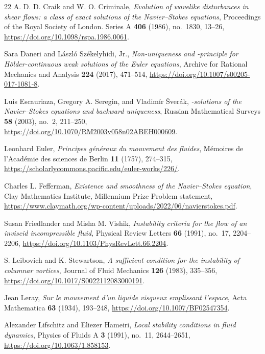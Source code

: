 \begin{thebibliography}{22}
A. D. D. Craik and W. O. Criminale,
\emph{Evolution of wavelike disturbances in shear flows: a class of exact solutions of the Navier--Stokes equations},
Proceedings of the Royal Society of London. Series A \textbf{406} (1986),
no.~1830, 13--26, \url{https://doi.org/10.1098/rspa.1986.0061}.

Sara Daneri and László Székelyhidi, Jr.,
\emph{Non-uniqueness and -principle for Hölder-continuous weak solutions of the Euler equations},
Archive for Rational Mechanics and Analysis \textbf{224} (2017), 471--514,
\url{https://doi.org/10.1007/s00205-017-1081-8}.

Luis Escauriaza, Gregory A. Seregin, and Vladimír Šverák,
\emph{-solutions of the Navier--Stokes equations and backward uniqueness},
Russian Mathematical Surveys \textbf{58} (2003), no.~2, 211--250,
\url{https://doi.org/10.1070/RM2003v058n02ABEH000609}.

Leonhard Euler, \emph{Principes généraux du mouvement des fluides},
Mémoires de l'Académie des sciences de Berlin \textbf{11} (1757), 274--315,
\url{https://scholarlycommons.pacific.edu/euler-works/226/}.

Charles L. Fefferman, \emph{Existence and smoothness of the Navier--Stokes equation},
Clay Mathematics Institute, Millennium Prize Problem statement,
\url{https://www.claymath.org/wp-content/uploads/2022/06/navierstokes.pdf}.

Susan Friedlander and Misha M. Vishik,
\emph{Instability criteria for the flow of an inviscid incompressible fluid},
Physical Review Letters \textbf{66} (1991), no.~17, 2204--2206,
\url{https://doi.org/10.1103/PhysRevLett.66.2204}.

S. Leibovich and K. Stewartson,
\emph{A sufficient condition for the instability of columnar vortices},
Journal of Fluid Mechanics \textbf{126} (1983), 335--356,
\url{https://doi.org/10.1017/S0022112083000191}.

Jean Leray, \emph{Sur le mouvement d'un liquide visqueux emplissant l'espace},
Acta Mathematica \textbf{63} (1934), 193--248,
\url{https://doi.org/10.1007/BF02547354}.

Alexander Lifschitz and Eliezer Hameiri,
\emph{Local stability conditions in fluid dynamics},
Physics of Fluids A \textbf{3} (1991), no.~11, 2644--2651,
\url{https://doi.org/10.1063/1.858153}.


\end{thebibliography}
